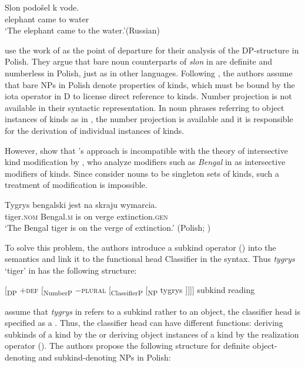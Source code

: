 \documentclass[output=paper,
colorlinks,
citecolor=brown,
newtxmath
]{langscibook}
\begin{document}
\ea \label{ex:22}
\gll Slon podošel k vode.\\
  elephant came to water\\
\glt `The elephant came to the water.'\hfill (Russian)
\z

\noindent {} use the work of \citeauthor{Borik.Espinal2012} as the point of departure for their analysis of the DP-structure in Polish. They argue that bare noun counterparts of \textit{slon} in  are definite and numberless in Polish, just as in other languages. Following \citeauthor{Borik.Espinal2012}, the authors assume that bare NPs in Polish denote properties of kinds, which must be bound by the iota operator in D to license direct reference to kinds. Number projection is not available in their syntactic representation. In noun phrases referring to object instances of kinds as in , the number projection is available and it is responsible for the derivation of individual instances of kinds.

However, \citeauthor{Kwapiszewski.Fuellenbach2021} show that \citeauthor{Borik.Espinal2012}'s approach is incompatible with the theory of intersective kind modification by \cite{McNally.Boleda2004}, who analyze modifiers such as \textit{Bengal} in  as intersective modifiers of kinds. Since \citeauthor{Borik.Espinal2012} consider nouns to be singleton sets of kinds, such a treatment of modification is impossible.

\ea \label{ex:23}
\gll Tygrys bengalski jest na skraju wymarcia.\\
 tiger.\textsc{nom} Bengal.\textsc{m} is on verge extinction.\textsc{gen} \\
\glt `The Bengal tiger is on the verge of extinction.'
\glt \hfill (Polish; )
\z

\noindent To solve this problem, the authors introduce a subkind operator () into the semantics and link it to the functional head Classifier in the syntax. Thus \textit{tygrys} `tiger' in  has the following structure:

\ea \label{ex:24} [\textsubscript{DP} \textsc{$+$def} [\textsubscript{NumberP} \textsc{$-$plural} [\textsubscript{ClassifierP}    [\textsubscript{NP} tygrys ]]]]   \hfill subkind reading
\z

\noindent \citeauthor{Kwapiszewski.Fuellenbach2021} assume that \textit{tygrys} in  refers to a subkind rather to an object, the classifier head is specified as a . Thus, the classifier head can have different functions:  deriving subkinds of a kind by the  or deriving object instances of a kind by the realization operator (). The authors propose the following structure for definite object-denoting and subkind-denoting NPs in Polish:
\end{document}
